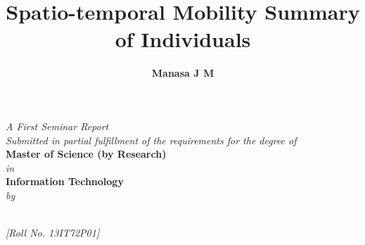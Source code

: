 

\title{\fontsize{16pt}{19.2pt}\selectfont\bf{ Spatio-temporal Mobility Summary of Individuals }}
\date{}
\maketitle
\thispagestyle{empty}
\begin{center}
\vspace*{-8mm}
\textit{A First Seminar Report\\Submitted in partial fulfillment of the requirements for the degree of \\}
\vspace*{6mm}
{\fontsize{14pt}{16.8pt}\selectfont\textbf{Master of Science (by Research)}} \\ \vspace*{3mm}
{\fontsize{14pt}{16.8pt}\selectfont\textit{in}} \\
\vspace*{3mm}
%
{\fontsize{14pt}{16.8pt}\selectfont\textbf{Information Technology}} \\

\vspace*{2mm}
{\fontsize{14pt}{16.8pt}\selectfont\textit{by}} \\
\vspace*{3mm}

\author{\fontsize{14pt}{16.8pt}\selectfont\textbf{Manasa J M }}\\
\vspace*{2mm}
{\fontsize{12pt}{14.4pt}\selectfont\textit{[Roll No. 13IT72P01]}} \\
\vspace*{3mm}


\end{center}
